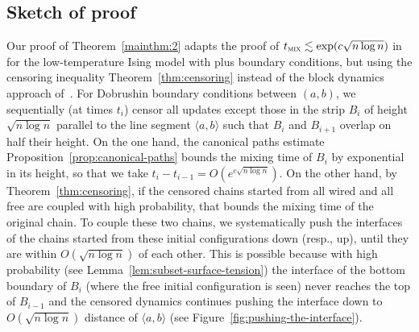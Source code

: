 \documentclass[reqno,11pt]{amsart}
\numberwithin{equation}{section}
\theoremstyle{definition}{
\newtheorem{example}[theorem]{Example}
\newtheorem{definition}[theorem]{Definition}
\newtheorem*{definition*}{Definition}
\newtheorem{problem}[theorem]{Problem}
\newtheorem{question}[theorem]{Question}
\newtheorem{remark}[theorem]{Remark}
}
\newcommand{\tmix}{t_{\textsc{mix}}}
\begin{document}
\subsection*{Sketch of proof}
Our proof of Theorem~\ref{mainthm:2} adapts the proof of $\tmix \lesssim \exp(c\sqrt{n\log n})$ in~\cite{Martinelli94} for the low-temperature Ising model with plus boundary conditions, but using the censoring inequality Theorem~\ref{thm:censoring} instead of the block dynamics approach of~\cite{Martinelli94}. For Dobrushin boundary conditions between $(a,b)$, we sequentially (at times $t_i$) censor all updates except those in the strip $B_i$ of height $\sqrt{n\log n}$ parallel to the line segment $\langle a,b\rangle$ such that $B_i$ and $B_{i+1}$ overlap on half their height. On the one hand, the canonical paths estimate Proposition~\ref{prop:canonical-paths} bounds the mixing time of $B_i$ by exponential in its height, so that we take $t_i - t_{i-1} =O(e^{c\sqrt{n\log n}})$. On the other hand, by Theorem~\ref{thm:censoring}, if the censored chains started from all wired and all free are coupled with high probability, that bounds the mixing time of the original chain. To couple these two chains, we systematically push the interfaces of the chains started from these initial configurations down (resp., up), until they are within $O(\sqrt{n\log n})$ of each other. This is possible because with high probability (see Lemma~\ref{lem:subset-surface-tension}) the interface of the bottom boundary of $B_i$ (where the free initial configuration is seen) never reaches the top of $B_{i-1}$ and the censored dynamics continues pushing the interface down to $O(\sqrt{n\log n})$ distance of $\langle a,b\rangle$ (see Figure~\ref{fig:pushing-the-interface}).
\end{document}
